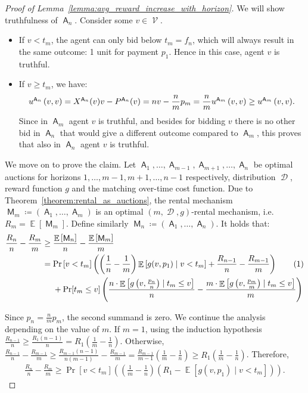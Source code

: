 \documentclass[11pt,letterpaper]{article}
\newcommand{\sqbr}[1]{\left[ #1 \right]}
\newcommand{\brackets}[1]{\left( #1 \right)}
\DeclareMathOperator*{\E}{\bb{E}}
\newcommand\numberthis{\addtocounter{equation}{1}\tag{\theequation}}
\newcommand{\bb}[1]{\mathbb{#1}}
\DeclareMathOperator{\A}{\auc{A}}
\DeclareMathOperator{\D}{\mathcal{D}}
\DeclareMathOperator{\M}{\mech{M}}
\DeclareMathOperator{\V}{\mathcal{V}}
\newcommand{\g}{g}
\theoremstyle{plain}
\newcommand{\auc}[1]{\mathsf{#1}}
\newcommand{\mech}[1]{\mathsf{#1}}
\begin{document}
\begin{proof}[Proof of Lemma~\ref{lemma:avg_reward_increase_with_horizon}]
    We will show truthfulness of $\A_n$. Consider some $v\in\V$.
    \begin{itemize}
        \item If $v<t_m$, the agent can only bid below $t_m=f_n$, which will always result in  the same outcome: 1 unit for payment $p_1$. Hence in this case, agent $v$ is truthful.
        \item If $v\geq t_m$, we have:
        \begin{align*}
            \util[\A_n]{v}{v}=\x[\A_n]{v}v-\p[\A_n]{v}=nv-\frac{n}{m}p_m=\frac{n}{m}\util[\A_m]{v}{v}\geq \util[\A_m]{v}{v}.
        \end{align*}
        Since in $\A_m$ agent $v$ is truthful, and besides for bidding $v$ there is no other bid in $\A_n$ that would give a different outcome compared to $\A_m$, this proves that also in $\A_n$ agent $v$ is truthful.
    \end{itemize}

    We move on to prove the claim. Let $\A_1,\dots,\A_{m-1},\A_{m+1},\dots,\A_n$ be  optimal auctions for horizons $1,\dots,m-1,m+1,\dots,n-1$ respectively, distribution $\D$, reward function $\g$ and the matching over-time cost function. Due to Theorem~\ref{theorem:rental_as_auctions}, the rental mechanism $\M_m\coloneq\brackets{\A_1,\dots,\A_m}$ is an optimal $\brackets{m,\D,\g}$-rental mechanism, i.e. $R_m=\E\sqbr{\M_m}$. Define similarly $\M_n\coloneq\brackets{\A_1,\dots,\A_n}$.
    It holds that:
    \begin{align*}
        \frac{R_n}{n}-\frac{R_m}{m}&\geq\frac{\E\sqbr{\M_n}}{n}-\frac{\E\sqbr{\M_m}}{m}\\
        &=\Pr\sqbr{v<t_m}\brackets{\brackets{\frac{1}{n}-\frac{1}{m}}\E\sqbr{\g(v,p_1)\mid v<t_m}+\frac{R_{n-1}}{n}-\frac{R_{m-1}}{m}}\numberthis\label{eq:4.6}\\
        &\ \ \ \ +\Pr[t_m\leq v]\brackets{\frac{n\cdot\E\sqbr{\g\brackets{v,\frac{p_n}{n}}\mid t_m\leq v}}{n}-\frac{m\cdot\E\sqbr{\g\brackets{v,\frac{p_m}{m}}\mid t_m\leq v}}{m}}
    \end{align*}

    Since $p_n=\frac{n}{m}p_m$, the second summand is zero. We continue the analysis depending on the value of $m$. If $m=1$, using the induction hypothesis $\frac{R_{n-1}}{n}\geq\frac{R_{1}(n-1)}{n}=R_1\brackets{\frac{1}{m}-\frac{1}{n}}$. Otherwise, $\frac{R_{n-1}}{n}-\frac{R_{m-1}}{m}\geq\frac{R_{m-1}(n-1)}{n(m-1)}-\frac{R_{m-1}}{m}=\frac{R_{m-1}}{m-1}\brackets{\frac{1}{m}-\frac{1}{n}}\geq R_1\brackets{\frac{1}{m}-\frac{1}{n}}$. 
    Therefore,
    \begin{align}\label{eq:4.7}
        \frac{R_n}{n}-\frac{R_m}{m}\geq\Pr\sqbr{v<t_m}\brackets{\brackets{\frac{1}{m}-\frac{1}{n}}\brackets{R_1-\E\sqbr{\g(v,p_1)\mid v<t_m}}}.
    \end{align}


\end{proof}
\end{document}
